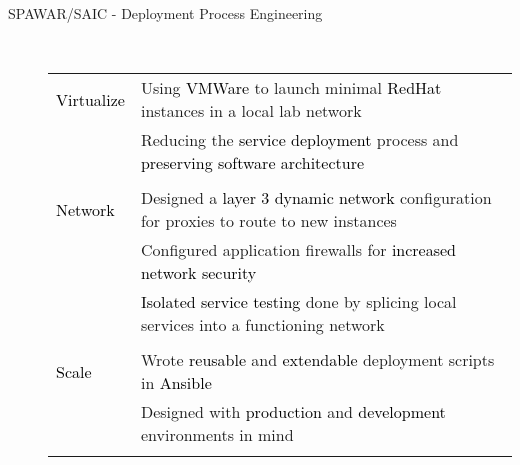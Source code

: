 \documentclass[11pt]{article}
\begin{document}
\begin{description}
\begin{description}
                \item[SPAWAR/SAIC - Deployment Process Engineering] \hfill \\
                \textcolor{gray}{
                    \begin{tabular}{l|l}
                        \\[-1.0mm]
                        \textcolor{black}{Virtualize}
                            & Using \textcolor{black}{VMWare} to launch minimal \textcolor{black}{RedHat} instances in a local lab network\\
                            & Reducing the \textcolor{black}{service deployment} process and \textcolor{black}{preserving software architecture}\\
                        \\[-1.7mm]
                        \textcolor{black}{Network}
                            & Designed a \textcolor{black}{layer 3 dynamic network} configuration for proxies to route to new instances\\
                            & Configured application firewalls for \textcolor{black}{increased network security}\\
                            & \textcolor{black}{Isolated service testing} done by splicing local services into a functioning network\\
                        \\[-1.7mm]
                        \textcolor{black}{Scale}
                            & Wrote \textcolor{black}{reusable} and \textcolor{black}{extendable} deployment scripts in \textcolor{black}{Ansible}\\
                            & Designed with \textcolor{black}{production} and \textcolor{black}{development} environments in mind\\
                        \\[-1.0mm]
                    \end{tabular}
                }


\end{description}
\end{description}
\end{document}
